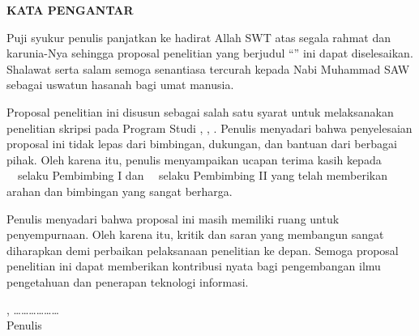 \thispagestyle{frontmatter}
\begin{center}
    {\large\bfseries KATA PENGANTAR}\\[1cm]
\end{center}

Puji syukur penulis panjatkan ke hadirat Allah SWT atas segala rahmat dan karunia-Nya sehingga proposal penelitian yang berjudul ``\mhsjudul'' ini dapat diselesaikan. Shalawat serta salam semoga senantiasa tercurah kepada Nabi Muhammad SAW sebagai uswatun hasanah bagi umat manusia.

Proposal penelitian ini disusun sebagai salah satu syarat untuk melaksanakan penelitian skripsi pada Program Studi \mhsprodi, \mhsfakultas, \mhsuniv. Penulis menyadari bahwa penyelesaian proposal ini tidak lepas dari bimbingan, dukungan, dan bantuan dari berbagai pihak. Oleh karena itu, penulis menyampaikan ucapan terima kasih kepada \sapaanPembimbingI\ \pembimbingI\ selaku Pembimbing I dan \sapaanPembimbingII\ \pembimbingII\ selaku Pembimbing II yang telah memberikan arahan dan bimbingan yang sangat berharga.

Penulis menyadari bahwa proposal ini masih memiliki ruang untuk penyempurnaan. Oleh karena itu, kritik dan saran yang membangun sangat diharapkan demi perbaikan pelaksanaan penelitian ke depan. Semoga proposal penelitian ini dapat memberikan kontribusi nyata bagi pengembangan ilmu pengetahuan dan penerapan teknologi informasi.

\vspace{1cm}
\begin{flushright}
    \kotapengajuan, \dots\dots\dots\dots\dots\dots \mhstahun \\
    \vspace{2cm}
    Penulis
\end{flushright}
\newpage
